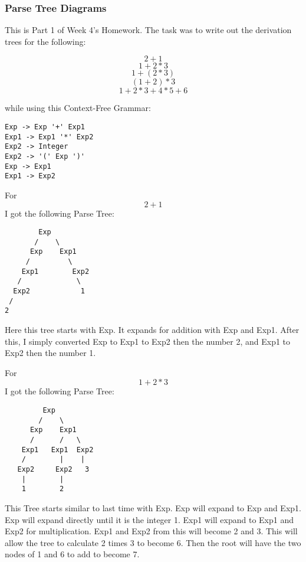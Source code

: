 \documentclass{article}
\theoremstyle{theorem}
\theoremstyle{definition}
\theoremstyle{remark}
\begin{document}
\subsubsection{Parse Tree Diagrams}
This is Part 1 of Week 4's Homework. The task was to write out the derivation trees for the following:

$$2+1$$
$$1+2*3$$
$$1+(2*3)$$
$$(1+2)*3$$
$$1+2*3+4*5+6$$

\noindent\newline while using this Context-Free Grammar:

\begin{verbatim}
Exp -> Exp '+' Exp1 
Exp1 -> Exp1 '*' Exp2              
Exp2 -> Integer            
Exp2 -> '(' Exp ')'  
Exp -> Exp1             
Exp1 -> Exp2                                     
\end{verbatim}


\noindent\newline For $$2+1$$ I got the following Parse Tree:

\begin{verbatim}
        Exp
       /    \
      Exp    Exp1
     /         \
    Exp1        Exp2
   /             \
  Exp2            1
 /
2
\end{verbatim}
\noindent\newline Here this tree starts with Exp. It expands for addition with Exp and Exp1. After this, I simply converted Exp to Exp1 to Exp2 then the number 2, and Exp1 to Exp2 then the number 1.

\noindent\newline\newline For $$1+2*3$$ I got the following Parse Tree:

\begin{verbatim}
         Exp
        /    \
      Exp    Exp1
      /      /   \
    Exp1   Exp1  Exp2
    /        |    |
   Exp2     Exp2   3
    |        |
    1        2  
\end{verbatim}
\noindent\newline This Tree starts similar to last time with Exp. Exp will expand to Exp and Exp1. Exp will expand directly until it is the integer 1. Exp1 will expand to Exp1 and Exp2 for multiplication. Exp1 and Exp2 from this will become 2 and 3. This will allow the tree to calculate 2 times 3 to become 6. Then the root will have the two nodes of 1 and 6 to add to become 7.
\end{document}
